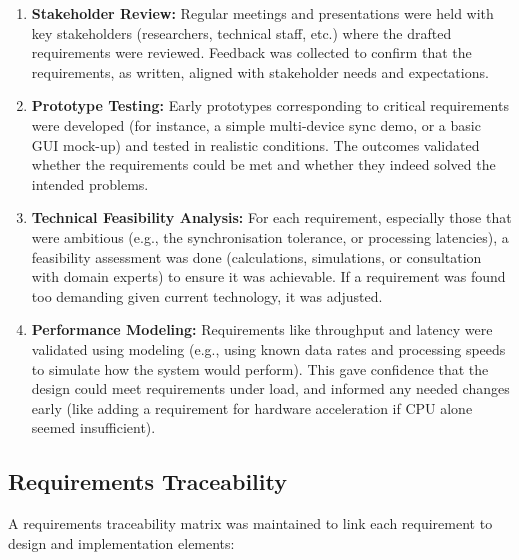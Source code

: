 \documentclass[11pt,a4paper]{report}
\begin{document}
\begin{enumerate}
\item \textbf{Stakeholder Review:} Regular meetings and presentations were held with key stakeholders (researchers, technical staff, etc.) where the drafted requirements were reviewed. Feedback was collected to confirm that the requirements, as written, aligned with stakeholder needs and expectations.
\item \textbf{Prototype Testing:} Early prototypes corresponding to critical requirements were developed (for instance, a simple multi-device sync demo, or a basic GUI mock-up) and tested in realistic conditions. The outcomes validated whether the requirements could be met and whether they indeed solved the intended problems.
\item \textbf{Technical Feasibility Analysis:} For each requirement, especially those that were ambitious (e.g., the synchronisation tolerance, or processing latencies), a feasibility assessment was done (calculations, simulations, or consultation with domain experts) to ensure it was achievable. If a requirement was found too demanding given current technology, it was adjusted.
\item \textbf{Performance Modeling:} Requirements like throughput and latency were validated using modeling (e.g., using known data rates and processing speeds to simulate how the system would perform). This gave confidence that the design could meet requirements under load, and informed any needed changes early (like adding a requirement for hardware acceleration if CPU alone seemed insufficient).
\end{enumerate} \subsection{Requirements Traceability}
A requirements traceability matrix was maintained to link each requirement to design and implementation elements:
\end{document}
